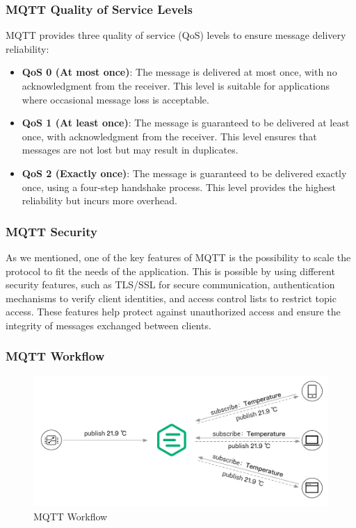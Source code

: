 \subsubsection{MQTT Quality of Service Levels}

MQTT provides three quality of service (QoS) levels to ensure message delivery reliability:
\begin{itemize}
    \item \textbf{QoS 0 (At most once)}: The message is delivered at most once, with no acknowledgment from the receiver. This level is suitable for applications where occasional message loss is acceptable.
    \item \textbf{QoS 1 (At least once)}: The message is guaranteed to be delivered at least once, with acknowledgment from the receiver. This level ensures that messages are not lost but may result in duplicates.
    \item \textbf{QoS 2 (Exactly once)}: The message is guaranteed to be delivered exactly once, using a four-step handshake process. This level provides the highest reliability but incurs more overhead.
\end{itemize}

\subsubsection{MQTT Security}

As we mentioned, one of the key features of MQTT is the possibility to scale the protocol to fit the needs of the application. This is possible by using different security features, such as TLS/SSL for secure communication, authentication mechanisms to verify client identities, and access control lists to restrict topic access. These features help protect against unauthorized access and ensure the integrity of messages exchanged between clients.

\subsubsection{MQTT Workflow}

\begin{figure}[h]
    \centering
    \includegraphics[width=\columnwidth]{img/mqtt-workflow-example.png}
    \caption{MQTT Workflow}
    \label{fig:mqtt-workflow}
\end{figure}

